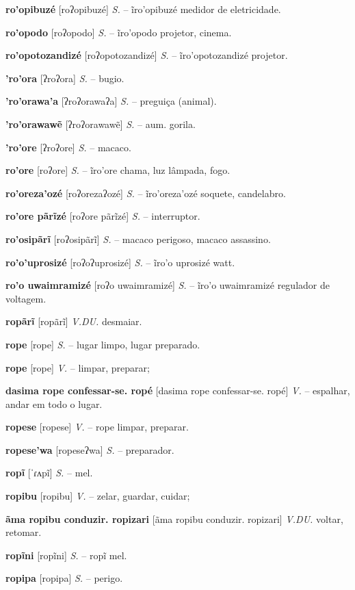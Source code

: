 \textbf{ro'opibuzé} [roʔopibuzé] \textit{S.} -- ĩro'opibuzé medidor de eletricidade.

\textbf{ro'opodo} [roʔopodo] \textit{S.} -- ĩro'opodo projetor, cinema.

\textbf{ro'opotozandizé} [roʔopotozandizé] \textit{S.} -- ĩro'opotozandizé projetor.

\textbf{'ro'ora} [ʔroʔora] \textit{S.} -- bugio.

\textbf{'ro'orawa'a} [ʔroʔorawaʔa] \textit{S.} -- preguiça (animal).

\textbf{'ro'orawawẽ} [ʔroʔorawawẽ] \textit{S.} -- aum. gorila.

\textbf{'ro'ore} [ʔroʔore] \textit{S.} -- macaco.

\textbf{ro'ore} [roʔore] \textit{S.} -- ĩro'ore chama, luz lâmpada, fogo.

\textbf{ro'oreza'ozé} [roʔorezaʔozé] \textit{S.} -- ĩro'oreza'ozé soquete, candelabro.

\textbf{ro'ore pãrĩzé} [roʔore pãrĩzé] \textit{S.} -- interruptor.

\textbf{ro'osipãrĩ} [roʔosipãrĩ] \textit{S.} -- macaco perigoso, macaco assassino.

\textbf{ro'o'uprosizé} [roʔoʔuprosizé] \textit{S.} -- ĩro'o uprosizé watt.

\textbf{ro'o uwaimramizé} [roʔo uwaimramizé] \textit{S.} -- ĩro'o uwaimramizé regulador de voltagem.

\textbf{ropãrĩ} [ropãrĩ] \textit{V.DU.} desmaiar.

\textbf{rope} [rope] \textit{S.} -- lugar limpo, lugar preparado.

\textbf{rope} [rope] \textit{V.} -- limpar, preparar;

\textbf{dasima rope confessar-se. ropé} [dasima rope confessar-se. ropé] \textit{V.} -- espalhar, andar em todo o lugar.

\textbf{ropese} [ropese] \textit{V.} -- rope limpar, preparar.

\textbf{ropese'wa} [ropeseʔwa] \textit{S.} -- preparador.

\textbf{ropĩ} [ˈɾʌpĩ] \textit{S.} -- mel.

\textbf{ropibu} [ropibu] \textit{V.} -- zelar, guardar, cuidar;

\textbf{ãma ropibu conduzir. ropizari} [ãma ropibu conduzir. ropizari] \textit{V.DU.} voltar, retomar.

\textbf{ropĩni} [ropĩni] \textit{S.} -- ropĩ mel.

\textbf{ropipa} [ropipa] \textit{S.} -- perigo.

